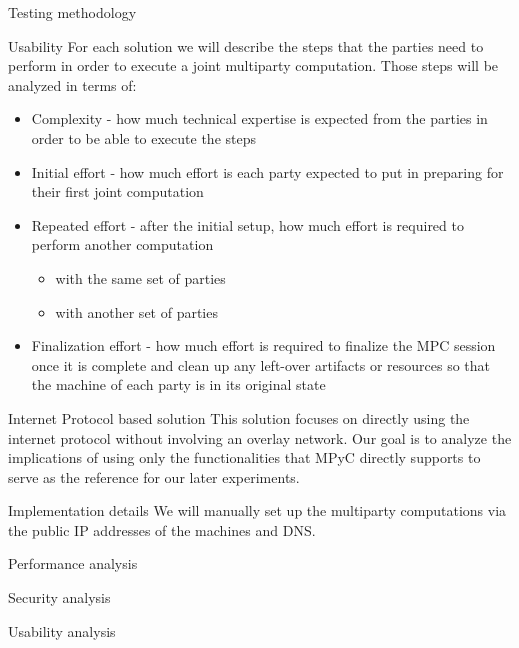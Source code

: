 \begin{frame}{Testing methodology}
\begin{block}{Usability}
\protect\hypertarget{thesis__030-methods.md__usability}{}
For each solution we will describe the steps that the parties need to
perform in order to execute a joint multiparty computation. Those steps
will be analyzed in terms of:

\begin{itemize}
\tightlist
\item
  Complexity - how much technical expertise is expected from the parties
  in order to be able to execute the steps
\item
  Initial effort - how much effort is each party expected to put in
  preparing for their first joint computation
\item
  Repeated effort - after the initial setup, how much effort is required
  to perform another computation

  \begin{itemize}
  \tightlist
  \item
    with the same set of parties
  \item
    with another set of parties
  \end{itemize}
\item
  Finalization effort - how much effort is required to finalize the MPC
  session once it is complete and clean up any left-over artifacts or
  resources so that the machine of each party is in its original state
\end{itemize}
\end{block}
\end{frame}

\hypertarget{thesis__050-internet-protocol.md}{}
\begin{frame}{Internet Protocol based solution}
\protect\hypertarget{thesis__050-internet-protocol.md__internet-protocol-based-solution}{}
This solution focuses on directly using the internet protocol without
involving an overlay network. Our goal is to analyze the implications of
using only the functionalities that MPyC directly supports to serve as
the reference for our later experiments.

\begin{block}{Implementation details}
\protect\hypertarget{thesis__050-internet-protocol.md__implementation-details}{}
We will manually set up the multiparty computations via the public IP
addresses of the machines and DNS.
\end{block}

\begin{block}{Performance analysis}
\protect\hypertarget{thesis__050-internet-protocol.md__performance-analysis}{}
\end{block}

\begin{block}{Security analysis}
\protect\hypertarget{thesis__050-internet-protocol.md__security-analysis}{}
\end{block}

\begin{block}{Usability analysis}
\protect\hypertarget{thesis__050-internet-protocol.md__usability-analysis}{}
\end{block}
\end{frame}


